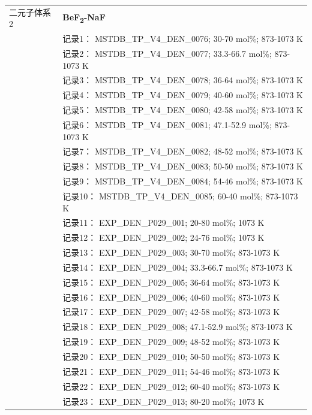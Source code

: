 \documentclass[12pt]{article}
\begin{document}
{\begin{longtable}[]{@{}
  >{\raggedright\arraybackslash}p{}
  >{\raggedright\arraybackslash}p{}@{}}
二元子体系 2  & \textbf{BeF\textsubscript{2}-NaF} \\
 & 记录1： MSTDB\_TP\_V4\_DEN\_0076; 30-70 mol\%; 873-1073 K \\
 & 记录2： MSTDB\_TP\_V4\_DEN\_0077; 33.3-66.7 mol\%; 873-1073 K \\
 & 记录3： MSTDB\_TP\_V4\_DEN\_0078; 36-64 mol\%; 873-1073 K \\
 & 记录4： MSTDB\_TP\_V4\_DEN\_0079; 40-60 mol\%; 873-1073 K \\
 & 记录5： MSTDB\_TP\_V4\_DEN\_0080; 42-58 mol\%; 873-1073 K \\
 & 记录6： MSTDB\_TP\_V4\_DEN\_0081; 47.1-52.9 mol\%; 873-1073 K \\
 & 记录7： MSTDB\_TP\_V4\_DEN\_0082; 48-52 mol\%; 873-1073 K \\
 & 记录8： MSTDB\_TP\_V4\_DEN\_0083; 50-50 mol\%; 873-1073 K \\
 & 记录9： MSTDB\_TP\_V4\_DEN\_0084; 54-46 mol\%; 873-1073 K \\
 & 记录10： MSTDB\_TP\_V4\_DEN\_0085; 60-40 mol\%; 873-1073 K \\
 & 记录11： EXP\_DEN\_P029\_001; 20-80 mol\%; 1073 K \\
 & 记录12： EXP\_DEN\_P029\_002; 24-76 mol\%; 1073 K \\
 & 记录13： EXP\_DEN\_P029\_003; 30-70 mol\%; 873-1073 K \\
 & 记录14： EXP\_DEN\_P029\_004; 33.3-66.7 mol\%; 873-1073 K \\
 & 记录15： EXP\_DEN\_P029\_005; 36-64 mol\%; 873-1073 K \\
 & 记录16： EXP\_DEN\_P029\_006; 40-60 mol\%; 873-1073 K \\
 & 记录17： EXP\_DEN\_P029\_007; 42-58 mol\%; 873-1073 K \\
 & 记录18： EXP\_DEN\_P029\_008; 47.1-52.9 mol\%; 873-1073 K \\
 & 记录19： EXP\_DEN\_P029\_009; 48-52 mol\%; 873-1073 K \\
 & 记录20： EXP\_DEN\_P029\_010; 50-50 mol\%; 873-1073 K \\
 & 记录21： EXP\_DEN\_P029\_011; 54-46 mol\%; 873-1073 K \\
 & 记录22： EXP\_DEN\_P029\_012; 60-40 mol\%; 873-1073 K \\
 & 记录23： EXP\_DEN\_P029\_013; 80-20 mol\%; 1073 K  \\


\end{longtable}}
\end{document}
